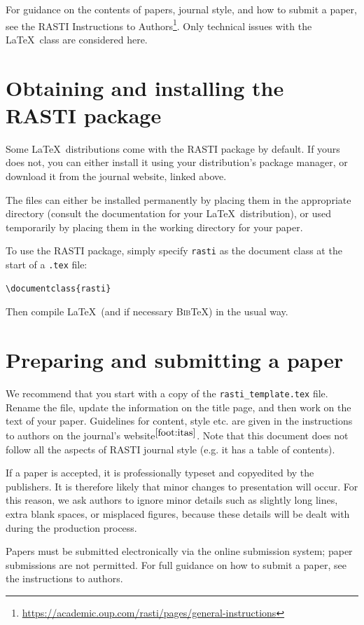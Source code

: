 \documentclass[fleqn,usenatbib,useAMS]{rasti}
\newcommand{\bibtex}{\textsc{Bib}\!\TeX} %
\begin{document}
For guidance on the contents of papers, journal style, and how to submit a paper, see the RASTI Instructions to Authors\footnote{\label{foot:itas}\url{https://academic.oup.com/rasti/pages/general-instructions}}.
Only technical issues with the \LaTeX\ class are considered here.


\section{Obtaining and installing the RASTI package}
Some \LaTeX\ distributions come with the RASTI package by default.
If yours does not, you can either install it using your distribution's package manager, or download it from the journal website, linked above.

The files can either be installed permanently by placing them in the appropriate directory (consult the documentation for your \LaTeX\ distribution), or used temporarily by placing them in the working directory for your paper.

To use the RASTI package, simply specify \verb'rasti' as the document class at the start of a \verb'.tex' file:

\begin{verbatim}
\documentclass{rasti}
\end{verbatim}
Then compile \LaTeX\ (and if necessary \bibtex) in the usual way.

\section{Preparing and submitting a paper}
We recommend that you start with a copy of the \texttt{rasti\_template.tex} file.
Rename the file, update the information on the title page, and then work on the text of your paper.
Guidelines for content, style etc. are given in the instructions to authors on the journal's website$^{\ref{foot:itas}}$.
Note that this document does not follow all the aspects of RASTI journal style (e.g. it has a table of contents).

If a paper is accepted, it is professionally typeset and copyedited by the publishers.
It is therefore likely that minor changes to presentation will occur.
For this reason, we ask authors to ignore minor details such as slightly long lines, extra blank spaces, or misplaced figures, because these details will be dealt with during the production process.

Papers must be submitted electronically via the online submission system; paper submissions are not permitted.
For full guidance on how to submit a paper, see the instructions to authors.
\end{document}
